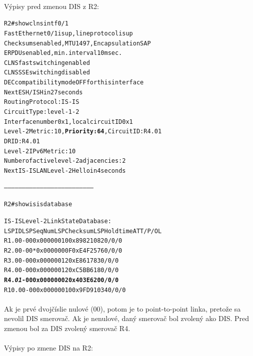 \documentclass[12pt,twoside,a4paper]{report}
\begin{document}
\paragraph{}
Výpisy pred zmenou DIS z R2:

\noindent
{\selectfont
\begin{small}
\begin{alltt}
R2#show clns int f0/1
FastEthernet0/1 is up, line protocol is up
  Checksums enabled, MTU 1497, Encapsulation SAP
  ERPDUs enabled, min. interval 10 msec.
  CLNS fast switching enabled
  CLNS SSE switching disabled
  DEC compatibility mode OFF for this interface
  Next ESH/ISH in 27 seconds
  Routing Protocol: IS-IS
    Circuit Type: level-1-2
    Interface number 0x1, local circuit ID 0x1
    Level-2 Metric: 10, \textbf{Priority: 64}, Circuit ID: R4.01
    DR ID: R4.01
    Level-2 IPv6 Metric: 10
    Number of active level-2 adjacencies: 2
    Next IS-IS LAN Level-2 Hello in 4 seconds


--------------------------------------------------------------------------


R2#show isis database

IS-IS Level-2 Link State Database:
LSPID                 LSP Seq Num  LSP Checksum  LSP Holdtime      ATT/P/OL
R1.00-00              0x00000010   0x8982        1082              0/0/0
R2.00-00            * 0x0000000F   0xE4F2        576               0/0/0
R3.00-00              0x00000012   0xE861        783               0/0/0
R4.00-00              0x00000012   0xC5BB        618               0/0/0
\textbf{R4.\textit{01}-00              0x00000002   0x403E        620               0/0/0}
R10.00-00             0x00000010   0x9FD9        1034              0/0/0

\end{alltt}
\end{small}
}

\paragraph{}
Ak je prvé dvojčíslie nulové (00), potom je to point-to-point linka, pretože sa nevolil DIS smerovač. Ak je nenulové, daný smerovač bol zvolený ako DIS. Pred zmenou bol za DIS zvolený smerovač R4.


\paragraph{}
Výpisy po zmene DIS na R2:
\end{document}
